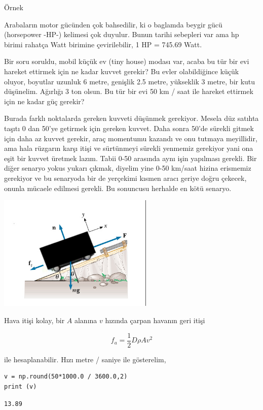 \documentclass[12pt,fleqn]{article}\usepackage{../../common}
\begin{document}
Örnek

Arabaların motor gücünden çok bahsedilir, ki o baglamda beygir gücü (horsepower
-HP-) kelimesi çok duyulur. Bunun tarihi sebepleri var ama hp birimi rahatça
Watt birimine çevirilebilir, 1 HP = 745.69 Watt.

Bir soru soruldu, mobil küçük ev (tiny house) modası var, acaba bu tür bir evi
hareket ettirmek için ne kadar kuvvet gerekir? Bu evler olabildiğince küçük
oluyor, boyutlar uzunluk 6 metre, genişlik 2.5 metre, yükseklik 3 metre, bir
kutu düşünelim. Ağırlığı 3 ton olsun. Bu tür bir evi 50 km / saat ile hareket
ettirmek için ne kadar güç gerekir?

Burada farklı noktalarda gereken kuvveti düşünmek gerekiyor. Mesela düz satıhta
taşıtı 0 dan 50'ye getirmek için gereken kuvvet. Daha sonra 50'de sürekli gitmek
için daha az kuvvet gerekir, araç momentumu kazandı ve onu tutmaya meyillidir,
ama hala rüzgarın karşı itişi ve sürtünmeyi sürekli yenmemiz gerekiyor yani ona
eşit bir kuvvet üretmek lazım. Tabii 0-50 arasında aynı işin yapılması
gerekli. Bir diğer senaryo yokus yukarı çıkmak, diyelim yine 0-50 km/saat hizina
erismemiz gerekiyor ve bu senaryoda bir de yerçekimi kısmen aracı geriye doğru
çekecek, onunla mücaele edilmesi gerekli. Bu sonuncusu herhalde en kötü senaryo.

\includegraphics[width=20em]{phy_005_basics_01_07.jpg}

Hava itişi kolay, bir $A$ alanına $v$ hızında çarpan havanın geri itişi

$$
f_a = \frac{1}{2} D \rho A v^2
$$

ile hesaplanabilir. Hızı metre / saniye ile gösterelim,

\begin{verbatim}
v = np.round(50*1000.0 / 3600.0,2)
print (v)
\end{verbatim}

\begin{verbatim}
13.89
\end{verbatim}
\end{document}
